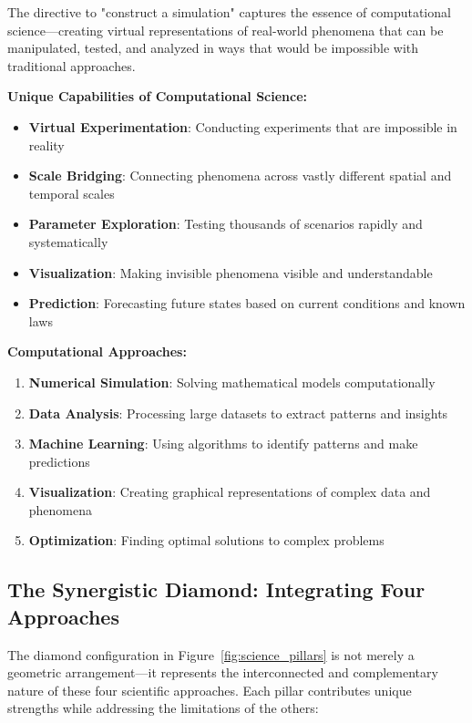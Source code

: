 The directive to "construct a simulation" captures the essence of computational science—creating virtual representations of real-world phenomena that can be manipulated, tested, and analyzed in ways that would be impossible with traditional approaches.

\textbf{Unique Capabilities of Computational Science:}
\begin{itemize}
    \item \textbf{Virtual Experimentation}: Conducting experiments that are impossible in reality
    \item \textbf{Scale Bridging}: Connecting phenomena across vastly different spatial and temporal scales
    \item \textbf{Parameter Exploration}: Testing thousands of scenarios rapidly and systematically
    \item \textbf{Visualization}: Making invisible phenomena visible and understandable
    \item \textbf{Prediction}: Forecasting future states based on current conditions and known laws
\end{itemize}

\textbf{Computational Approaches:}
\begin{enumerate}
    \item \textbf{Numerical Simulation}: Solving mathematical models computationally
    \item \textbf{Data Analysis}: Processing large datasets to extract patterns and insights
    \item \textbf{Machine Learning}: Using algorithms to identify patterns and make predictions
    \item \textbf{Visualization}: Creating graphical representations of complex data and phenomena
    \item \textbf{Optimization}: Finding optimal solutions to complex problems
\end{enumerate}

\subsection{The Synergistic Diamond: Integrating Four Approaches}

The diamond configuration in Figure~\ref{fig:science_pillars} is not merely a geometric arrangement—it represents the interconnected and complementary nature of these four scientific approaches. Each pillar contributes unique strengths while addressing the limitations of the others:

